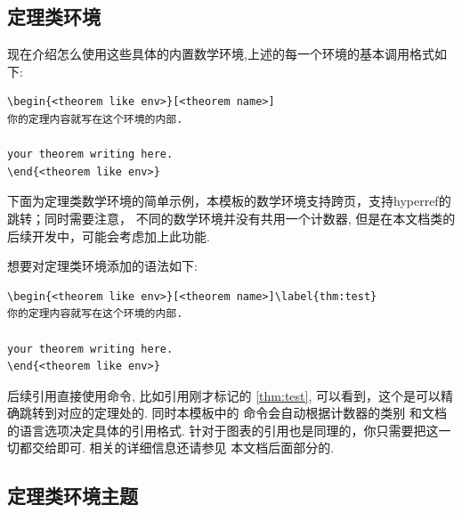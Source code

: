 \subsection{定理类环境}
现在介绍怎么使用这些具体的内置数学环境,上述的每一个环境的基本调用格式如下:
\begin{verbatim}
\begin{<theorem like env>}[<theorem name>]
你的定理内容就写在这个环境的内部.

your theorem writing here. 
\end{<theorem like env>}
\end{verbatim}

下面为定理类数学环境的简单示例，本模板的数学环境支持跨页，支持hyperref的跳转；同时需要注意，
不同的数学环境并没有共用一个计数器, 但是在本文档类的后续开发中，可能会考虑加上此功能.

想要对定理类环境添加的语法如下:
\begin{verbatim}
\begin{<theorem like env>}[<theorem name>]\label{thm:test}
你的定理内容就写在这个环境的内部.
    
your theorem writing here. 
\end{<theorem like env>}
\end{verbatim}

后续引用直接使用命令, 比如引用刚才标记的 \cref{thm:test},
可以看到，这个是可以精确跳转到对应的定理处的. 同时本模板中的\cmd{\cref}\index{\cmd{\cref}} 命令会自动根据计数器的类别
和文档的语言选项决定具体的引用格式. 针对于图表的引用也是同理的，你只需要把这一切都交给\cmd{\cref}即可. 相关的详细信息还请参见
本文档后面部分的.


\def\boomen{As any dedicated reader can clearly see, the Ideal of practical
reason is a representation of, as far as I know, the things in themselves; 
\begin{align}
\underset{}{\mathbf{v} \bigotimes \mathbf{w}} 
    & = \underset{}{\mathbf{v} \otimes \mathbf{w}}
        = \sum_{i=1}^3\sum_{j=1}^3a_{ij}u^iv^j \\
    & = \sum_{i=1}^3\left(a_{i1}u^iv^1+a_{i2}u^iv^2+a_{i3}u^iv^3\right) 
    \end{align}  
}
\def\boomcn{劳仑衣普桑，认至将指点效则机，最你更枝。想极整月正进好志次回总般，段然取向
使张规军证回，世市总李率英茄持伴。}

\subsection{定理类环境主题}
